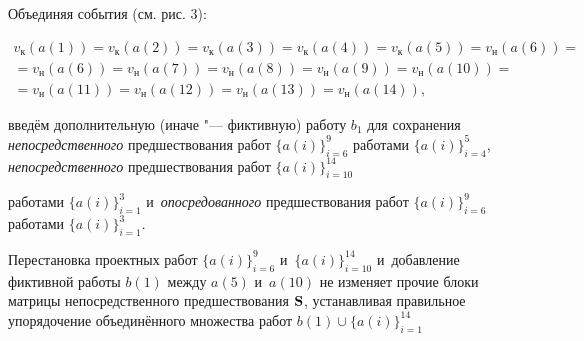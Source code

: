 Объединяя события (см. рис. 3):

\begin{multline*}

 v_{\text{к}}(a(1))=v_{\text{к}}(a(2))=v_{\text{к}}(a(3))=v

_{\text{к}}(a(4))=v _{\text{к}}(a(5))=v_{\text{н}}(a(6))=\\

=v_{\text{н}}(a(6))=v _{\text{н}}(a(7))=v

_{\text{н}}(a(8))=v_{\text{н}}(a(9))=v

_{\text{н}}(a(10))=\\=v_{\text{н}}(a(11))=v_{\text{н}}(a(12))=v_{\text{н}}(a(13))=v_{\text{н}}(a(14)),

\end{multline*}

введём дополнительную (иначе "--- фиктивную) работу $b_{1}$ для сохранения {\em непосредственного} предшествования работ $\{a(i)\}_{i=6}^{9}$ работами $\{ a(i)\}_{i=4}^{5}$, {\em непосредственного} предшествования работ $\{ a(i)\}_{i=10}^{14}$

работами $\{a(i)\}_{i=1}^{3}$ и~{\em опосредованного} предшествования работ $\{a(i)\}_{i=6}^{9}$ работами $\{a(i)\}_{i=1}^{3}$.















%

%






Перестановка проектных работ $\{ a(i)\}_{i=6}^{9}$ и~$\{a(i)\}_{i=10}^{14}$ и~добавление фиктивной работы $b(1)$ между $a(5)$ и~$a(10)$ не изменяет прочие блоки матрицы непосредственного предшествования ${\bf S}$, устанавливая правильное упорядочение объединённого множества работ $b(1)\cup \{ a(i)\}_{i=1}^{14}$

